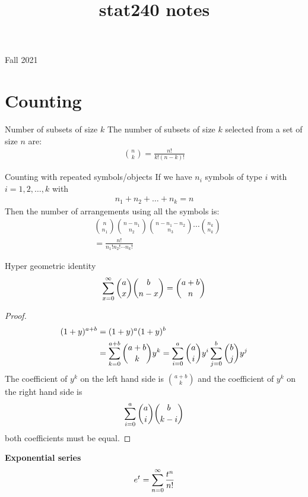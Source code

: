 \documentclass[16pt,a4paper]{article}
\title{ stat240 notes}
\date{}
\begin{document}
\maketitle
\begin{center}
Fall 2021
\end{center}
\newpage
\section{Counting}
\begin{thm}{Number of subsets of size $k$}
The number of subsets of size $k$ selected from a set of size $n$ are:
\begin{align*}
{n \choose k} = \frac{n!}{k!(n-k)!}
\end{align*}
\end{thm}
\begin{thm}{Counting with repeated symbols/objects}
If we have $n_i$ symbols of type $i$ with $i=1,2, \ldots, k$ with \begin{align*}
n_1 + n_2 + \ldots + n_k = n
\end{align*}
Then the number of arrangements using all the symbols is: 
\begin{align*}
&{n\choose n_1}{n-n_1 \choose n_2}{n-n_1-n_2 \choose n_3} \cdots {n_k \choose n_k}\\
&= \frac{n!}{n_1!n_2!\cdots n_k!}
\end{align*} 
\end{thm}

\begin{thm}{Hyper geometric identity}
\begin{align*}
\sum\limits_{x=0}^{\infty}{a\choose x}{b \choose n-x} = {a+b\choose n}
\end{align*}
\begin{proof}
\begin{align*}
(1+y)^{a+b} &= (1+y)^a(1+y)^b\\
&= \sum\limits_{k=0}^{a+b}{a+b\choose k}y^k = \sum\limits_{i=0}^{a}{a\choose i}y^i\sum\limits_{j=0}^{b}{b\choose j}y^j
\end{align*}
The coefficient of $y^k$ on the left hand side is ${a+b\choose k}$ and the coefficient of $y^k$ on the right hand side is 
\begin{align*}
\sum\limits_{i=0}^{a}{a\choose i}{b\choose k-i}
\end{align*}
both coefficients must be equal. 
\end{proof}
\end{thm}

\begin{thm}{\textbf{Exponential series}}
\begin{align*}
e^t = \sum\limits_{n=0}^{\infty}\frac{t^n}{n!}
\end{align*}
\end{thm}
\newpage
\end{document}
